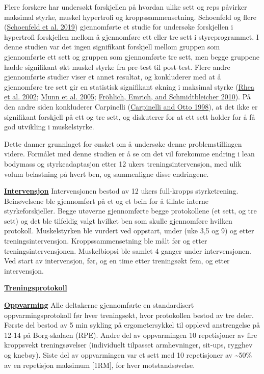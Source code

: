 \documentclass[
]{book}
\begin{document}
Flere forskere har undersøkt forskjellen på hvordan ulike sett og reps
påvirker maksimal styrke, muskel hypertrofi og kroppssammensetning.
Schoenfeld og flere (\protect\hyperlink{ref-2019}{Schoenfeld et al.
2019}) gjennomførte et studie for undersøke forskjellen i hypertrofi
forskjellen mellom å gjennomføre ett eller tre sett i styreprogrammet. I
denne studien var det ingen signifikant forskjell mellom gruppen som
gjennomførte ett sett og gruppen som gjennomførte tre sett, men begge
gruppene hadde signifikant økt muskel styrke fra pre-test til post-test.
Flere andre gjennomførte studier viser et annet resultat, og konkluderer
med at å gjennomføre tre sett gir en statistisk signifikant økning i
maksimal styrke (\protect\hyperlink{ref-rhea2002}{Rhea et al. 2002};
\protect\hyperlink{ref-munn2005}{Munn et al. 2005};
\protect\hyperlink{ref-fruxf6hlich2010}{Fröhlich, Emrich, and
Schmidtbleicher 2010}). På den andre siden konkluderer Carpinelli
(\protect\hyperlink{ref-carpinelli1998}{Carpinelli and Otto 1998}), at
det ikke er signifikant forskjell på ett og tre sett, og diskuterer for
at ett sett holder for å få god utvikling i muskelstyrke.

Dette danner grunnlaget for ønsket om å undersøke denne
problemstillingen videre. Formålet med denne studien er å se om det vil
forekomme endring i lean bodymass og styrkeadaptasjon etter 12 ukers
treningsintervensjon, med ulik volum belastning på hvert ben, og
sammenligne disse endringene.

\underline{\textbf{Intervensjon}} Intervensjonen bestod av 12 ukers
full-kropps styrketrening. Beinøvelsene ble gjennomført på et og et bein
for å tillate interne styrkeforskjeller. Begge utøverne gjennomførte
begge protokollene (et sett, og tre sett) og det ble tilfeldig valgt
hvilket ben som skulle gjennomføre hvilken protokoll. Muskelstyrken ble
vurdert ved oppstart, under (uke 3,5 og 9) og etter
treningsintervensjon. Kroppssammensetning ble målt før og etter
treningsintervensjonen. Muskelbiopsi ble samlet 4 ganger under
intervensjonen. Ved start av intervensjon, før, og en time etter
treningsøkt fem, og etter intervensjon.

\underline{\textbf{Treningsprotokoll}}

\underline{\textbf{Oppvarming}} Alle deltakerne gjennomførte en
standardisert oppvarmingsprotokoll før hver treningsøkt, hvor
protokollen bestod av tre deler. Første del bestod av 5 min sykling på
ergometersykkel til opplevd anstrengelse på 12-14 på Borg-skalaen (RPE).
Andre del av oppvarmingen 10 repetisjoner av fire kroppsvekt
treningsøvelser (individuelt tilpasset armhevninger, sit-ups, rygghev og
knebøy). Siste del av oppvarmingen var et sett med 10 repetisjoner av
\textasciitilde50\% av en repetisjon maksimum {[}1RM{]}, for hver
motstandsøvelse.
\end{document}
